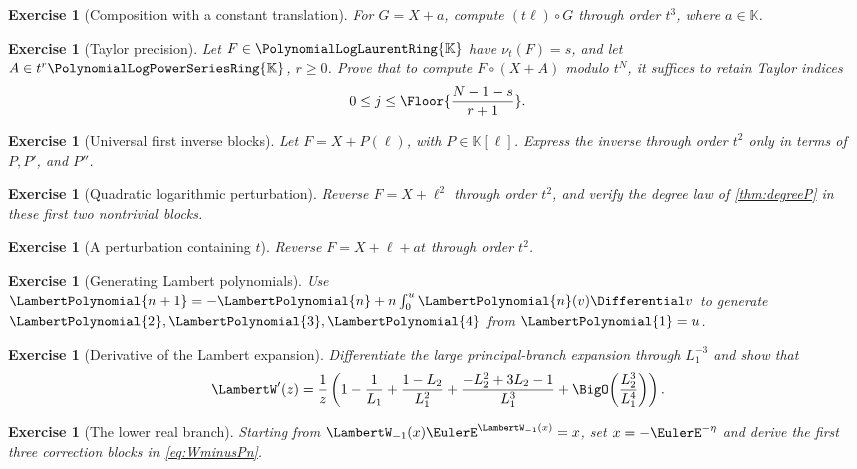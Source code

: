 \documentclass[11pt,oneside,openany]{book}
\newtheorem{exercise}[theorem]{Exercise}
\newcommand{\K}{\mathbb{K}}
\newcommand{\Rring}{\PolynomialLogPowerSeriesRing{\K}}
\newcommand{\Pring}{\PolynomialLogLaurentRing{\K}}
\newcommand{\ordt}{\nu_t}
\newcommand{\compose}{\mathbin{\circ}}
\begin{document}
\begin{exercise}[Composition with a constant translation]
For \(G=X+a\), compute
\((t\ell)\compose G\) through order \(t^3\), where \(a\in\K\).
\end{exercise}

\begin{exercise}[Taylor precision]
Let \(F\in\Pring\) have \(\ordt(F)=s\), and let
\(A\in t^r\Rring\), \(r\geq0\).  Prove that to compute
 \(F\compose(X+A)\) modulo \(t^N\), it suffices to retain Taylor indices
\[
 0\leq j\leq
 \Floor{\frac{N-1-s}{r+1}}.
\]
\end{exercise}

\begin{exercise}[Universal first inverse blocks]
Let \(F=X+P(\ell)\), with \(P\in\K[\ell]\).  Express the inverse through
order \(t^2\) only in terms of \(P,P'\), and \(P''\).
\end{exercise}

\begin{exercise}[Quadratic logarithmic perturbation]
Reverse \(F=X+\ell^2\) through order \(t^2\), and verify the degree law of
\cref{thm:degreeP} in these first two nontrivial blocks.
\end{exercise}

\begin{exercise}[A perturbation containing \(t\)]
Reverse \(F=X+\ell+at\) through order \(t^2\).
\end{exercise}

\begin{exercise}[Generating Lambert polynomials]
Use
\(\LambertPolynomial{n+1}=-\LambertPolynomial{n}+n\int_0^u\LambertPolynomial{n}(v)\Differential v\) to generate \(\LambertPolynomial{2},\LambertPolynomial{3},\LambertPolynomial{4}\) from
\(\LambertPolynomial{1}=u\).
\end{exercise}

\begin{exercise}[Derivative of the Lambert expansion]
Differentiate the large principal-branch expansion through
\(L_1^{-3}\) and show that
\[
 \LambertW'(z)=\frac1z\left(1-\frac1{L_1}
 +\frac{1-L_2}{L_1^2}
 +\frac{-L_2^2+3L_2-1}{L_1^3}
 +\BigO\!\left(\frac{L_2^3}{L_1^4}\right)\right).
\]
\end{exercise}

\begin{exercise}[The lower real branch]
Starting from \(\LambertW_{-1}(x)\EulerE^{\LambertW_{-1}(x)}=x\), set
\(x=-\EulerE^{-\eta}\) and derive the first three correction blocks in
\cref{eq:WminusPn}.
\end{exercise}
\end{document}
